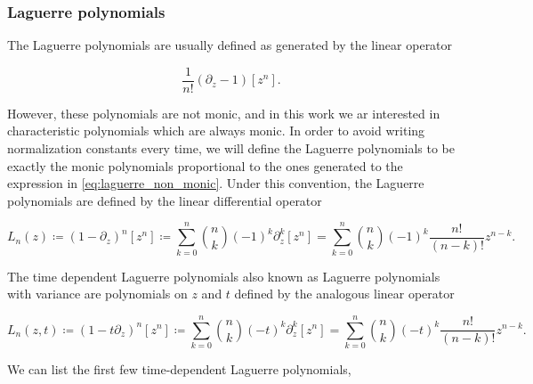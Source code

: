 \subsubsection{Laguerre polynomials}

    The Laguerre polynomials are usually defined as generated by the linear operator

    \begin{equation} \label{eq:laguerre_non_monic}
        \frac1{n!}\left(\partial_z - 1\right)[z^n].
    \end{equation}

    However, these polynomials are not monic, and in this work we ar interested in characteristic polynomials which are always monic. In order to avoid writing normalization constants every time, we will define the Laguerre polynomials to be exactly the monic polynomials proportional to the ones generated to the expression in \eqref{eq:laguerre_non_monic}. Under this convention, the Laguerre polynomials are defined by the linear differential operator 

    \begin{equation*}
        L_n(z) \coloneqq (1 - \partial_z)^n [z^n] \coloneqq \sum_{k=0}^n \binom{n}{k} (-1)^k\partial_z^k[z^n] = \sum_{k=0}^n \binom{n}{k} (-1)^k \frac{n!}{(n-k)!} z^{n-k}. 
    \end{equation*}

    The time dependent Laguerre polynomials also known as Laguerre polynomials with variance are polynomials on $z$ and $t$ defined by the analogous linear operator

    \begin{equation*}
        L_n(z,t) \coloneqq (1 - t\partial_z)^n [z^n] \coloneqq \sum_{k=0}^n \binom{n}{k} (-t)^k\partial_z^k[z^n] = \sum_{k=0}^n \binom{n}{k} (-t)^k \frac{n!}{(n-k)!} z^{n-k}.
    \end{equation*}

    We can list the first few time-dependent Laguerre polynomials,

